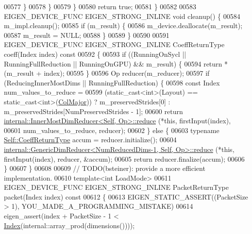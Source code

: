 \begin{DoxyCode}
00577         \}
00578       \}
00579     \}
00580     \textcolor{keywordflow}{return} \textcolor{keyword}{true};
00581   \}
00582 
00583   EIGEN\_DEVICE\_FUNC EIGEN\_STRONG\_INLINE \textcolor{keywordtype}{void} cleanup() \{
00584     m\_impl.cleanup();
00585     \textcolor{keywordflow}{if} (m\_result) \{
00586       m\_device.deallocate(m\_result);
00587       m\_result = NULL;
00588     \}
00589   \}
00590 
00591   EIGEN\_DEVICE\_FUNC EIGEN\_STRONG\_INLINE CoeffReturnType coeff(Index index)\textcolor{keyword}{ const}
00592 \textcolor{keyword}{  }\{
00593     \textcolor{keywordflow}{if} ((RunningOnSycl || RunningFullReduction || RunningOnGPU) && m\_result) \{
00594       \textcolor{keywordflow}{return} *(m\_result + index);
00595     \}
00596     Op reducer(m\_reducer);
00597     \textcolor{keywordflow}{if} (ReducingInnerMostDims || RunningFullReduction) \{
00598       \textcolor{keyword}{const} Index num\_values\_to\_reduce =
00599         (\textcolor{keyword}{static\_cast<}\textcolor{keywordtype}{int}\textcolor{keyword}{>}(Layout) == static\_cast<int>(\hyperlink{group__enums_ggaacded1a18ae58b0f554751f6cdf9eb13a0cbd4bdd0abcfc0224c5fcb5e4f6669a}{ColMajor})) ? m\_preservedStrides[0] : 
      m\_preservedStrides[NumPreservedStrides - 1];
00600       \textcolor{keywordflow}{return} \hyperlink{struct_eigen_1_1internal_1_1_inner_most_dim_reducer}{internal::InnerMostDimReducer<Self, Op>::reduce}
      (*\textcolor{keyword}{this}, firstInput(index),
00601                                                              num\_values\_to\_reduce, reducer);
00602     \} \textcolor{keywordflow}{else} \{
00603       \textcolor{keyword}{typename} \hyperlink{group___sparse_core___module}{Self::CoeffReturnType} accum = reducer.initialize();
00604       \hyperlink{struct_eigen_1_1internal_1_1_generic_dim_reducer}{internal::GenericDimReducer<NumReducedDims-1, Self, Op>::reduce}
      (*\textcolor{keyword}{this}, firstInput(index), reducer, &accum);
00605       \textcolor{keywordflow}{return} reducer.finalize(accum);
00606     \}
00607   \}
00608 
00609   \textcolor{comment}{// TODO(bsteiner): provide a more efficient implementation.}
00610   \textcolor{keyword}{template}<\textcolor{keywordtype}{int} LoadMode>
00611   EIGEN\_DEVICE\_FUNC EIGEN\_STRONG\_INLINE PacketReturnType packet(Index index)\textcolor{keyword}{ const}
00612 \textcolor{keyword}{  }\{
00613     EIGEN\_STATIC\_ASSERT((PacketSize > 1), YOU\_MADE\_A\_PROGRAMMING\_MISTAKE)
00614     eigen\_assert(index + PacketSize - 1 < \hyperlink{namespace_eigen_a62e77e0933482dafde8fe197d9a2cfde}{Index}(internal::array\_prod(dimensions())));

\end{DoxyCode}
